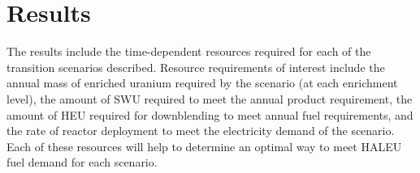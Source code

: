 \section{Results}

The results include the time-dependent resources required 
for each of the transition scenarios described. Resource requirements
of interest include the annual mass of enriched uranium required by 
the scenario (at each enrichment level), the amount of 
\gls{SWU} required to meet the annual product requirement, the amount 
of \gls{HEU} required for downblending to meet annual fuel requirements, 
and the rate of reactor deployment to meet the 
electricity demand of the scenario. Each of these resources will help
to determine an optimal way to meet \gls{HALEU} fuel demand for each 
scenario. 

